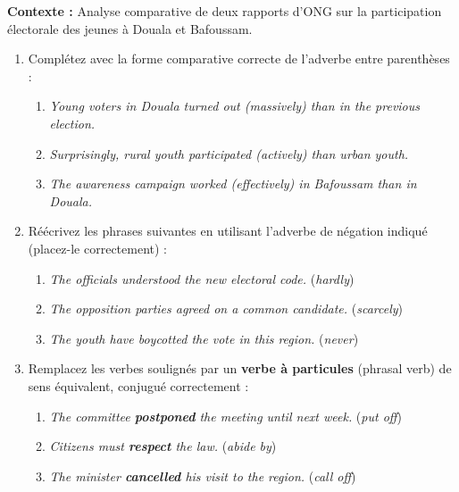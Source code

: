 \documentclass[11pt]{article}
\begin{document}
\begin{exercice}
\textbf{Contexte :} Analyse comparative de deux rapports d'ONG sur la participation électorale des jeunes à Douala et Bafoussam.

\begin{enumerate}
\item Complétez avec la forme comparative correcte de l'adverbe entre parenthèses :
      \begin{enumerate}
      \item \textit{Young voters in Douala turned out \underline{\hspace{3cm}} (massively) than in the previous election.}
      \item \textit{Surprisingly, rural youth participated \underline{\hspace{3cm}} (actively) than urban youth.}
      \item \textit{The awareness campaign worked \underline{\hspace{3cm}} (effectively) in Bafoussam than in Douala.}
      \end{enumerate}
\item Réécrivez les phrases suivantes en utilisant l'adverbe de négation indiqué (placez-le correctement) :
      \begin{enumerate}
      \item \textit{The officials understood the new electoral code.} (\textit{hardly})
      \item \textit{The opposition parties agreed on a common candidate.} (\textit{scarcely})
      \item \textit{The youth have boycotted the vote in this region.} (\textit{never})
      \end{enumerate}
\item Remplacez les verbes soulignés par un \textbf{verbe à particules} (phrasal verb) de sens équivalent, conjugué correctement :
      \begin{enumerate}
      \item \textit{The committee \textbf{postponed} the meeting until next week.} (\textit{put off})
      \item \textit{Citizens must \textbf{respect} the law.} (\textit{abide by})
      \item \textit{The minister \textbf{cancelled} his visit to the region.} (\textit{call off})
      \end{enumerate}
\end{enumerate}
\end{exercice}
\end{document}
